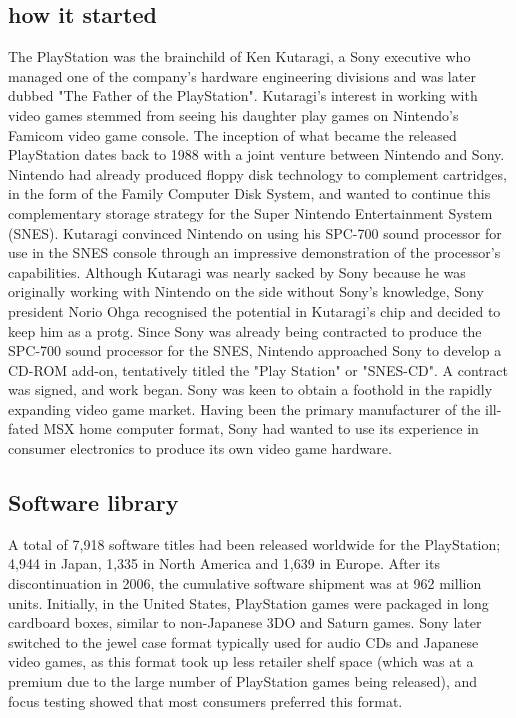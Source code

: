 \documentclass[a4paper,10pt]{book}
\begin{document}
 \subsection{how it started }
 
          The PlayStation was the brainchild of Ken Kutaragi, a Sony executive who managed one of the company's hardware engineering divisions and was later dubbed "The Father of the PlayStation".
          Kutaragi's interest in working with video games stemmed from seeing his daughter play games on Nintendo's Famicom video game console.
          The inception of what became the released PlayStation dates back to 1988 with a joint venture between Nintendo and Sony. 
          Nintendo had already produced floppy disk technology to complement cartridges, in the form of the Family Computer Disk System, and wanted to continue this complementary storage strategy for the Super Nintendo Entertainment System (SNES).
          Kutaragi convinced Nintendo on using his SPC-700 sound processor for use in the SNES console through an impressive demonstration of the processor's capabilities. 
          Although Kutaragi was nearly sacked by Sony because he was originally working with Nintendo on the side without Sony's knowledge, Sony president Norio Ohga recognised the potential in Kutaragi's chip and decided to keep him as a protg. 
          Since Sony was already being contracted to produce the SPC-700 sound processor for the SNES, Nintendo approached Sony to develop a CD-ROM add-on, tentatively titled the "Play Station" or "SNES-CD". A contract was signed, and work began. 
          Sony was keen to obtain a foothold in the rapidly expanding video game market. Having been the primary manufacturer of the ill-fated MSX home computer format, Sony had wanted to use its experience in consumer electronics to produce its own video game hardware. 
 
 \subsection{Software library }
 
          A total of 7,918 software titles had been released worldwide for the PlayStation; 4,944 in Japan, 1,335 in North America and 1,639 in Europe. After its discontinuation in 2006, the cumulative software shipment was at 962 million units. 
          Initially, in the United States, PlayStation games were packaged in long cardboard boxes, similar to non-Japanese 3DO and Saturn games. Sony later switched to the jewel case format typically used for audio CDs and Japanese video games, as this format took up less retailer shelf space (which was at a premium due to the large number of PlayStation games being released), and focus testing showed that most consumers preferred this format.
         
\end{document}
